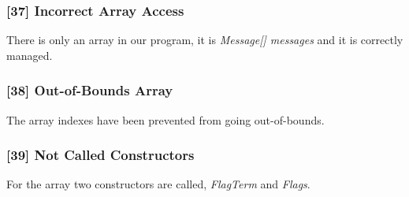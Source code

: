 \subsubsection{[37] Incorrect Array Access}
There is only an array in our program, it is \textit{Message[] messages} and it is correctly managed.

\subsubsection{[38] Out-of-Bounds Array}
The array indexes have been prevented from going out-of-bounds.

\subsubsection{[39] Not Called Constructors}
For the array two constructors are called, \textit{FlagTerm} and \textit{Flags}.
